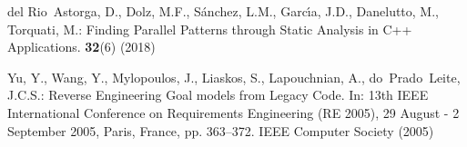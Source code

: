 \documentclass[smallextended]{svjour3}
\begin{document}
\begin{thebibliography}{10}
del Rio~Astorga, D., Dolz, M.F., S{\'{a}}nchez, L.M., Garc{\'{\i}}a, J.D.,
  Danelutto, M., Torquati, M.: Finding Parallel Patterns through Static
  Analysis in {C++} Applications.
 \textbf{32}(6) (2018)

Yu, Y., Wang, Y., Mylopoulos, J., Liaskos, S., Lapouchnian, A., do~Prado~Leite,
  J.C.S.: Reverse Engineering Goal models from Legacy Code.
\newblock In: {13th IEEE International Conference on Requirements Engineering (RE 2005), 29 August - 2 September 2005, Paris, France}, pp. 363--372. {IEEE} Computer Society (2005)

\end{thebibliography}
\end{document}
